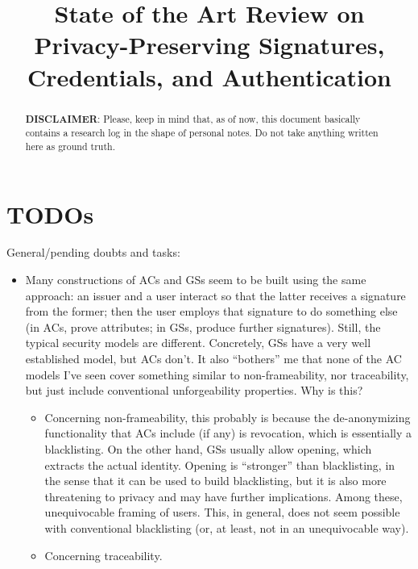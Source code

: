 \documentclass{llncs}%
\title{State of the Art Review on Privacy-Preserving Signatures, Credentials, and Authentication}
\author{}
\begin{document}
\maketitle


\begin{abstract}
	\textbf{DISCLAIMER}: Please, keep in mind that, as of now, this document
	basically contains a research log in the shape of personal notes. Do not take 
	anything written here as ground truth.
\end{abstract}










\section{TODOs}

General/pending doubts and tasks:

\begin{itemize}
\item Many constructions of ACs and GSs seem to be built using the same
  approach: an issuer and a user interact so that the latter receives a signature
  from the former; then the user employs that signature to do something else (in
  ACs, prove attributes; in GSs, produce further signatures). Still, the typical
  security models are different. Concretely, GSs have a very well established
  model, but ACs don't. It also ``bothers'' me that none of the AC models I've
  seen cover something similar to non-frameability, nor traceability, but just
  include conventional unforgeability properties. Why is this?
  \begin{itemize}
  \item Concerning non-frameability, this probably is because the de-anonymizing
    functionality that ACs include (if any) is revocation, which is essentially
    a blacklisting. On the other hand, GSs usually allow opening, which extracts
    the actual identity. Opening is ``stronger'' than blacklisting, in the sense
    that it can be used to build blacklisting, but it is also more threatening
    to privacy and may have further implications. Among these, unequivocable
    framing of users. This, in general, does not seem possible with conventional
    blacklisting (or, at least, not in an unequivocable way).
  \item Concerning traceability.
  \end{itemize}
\end{itemize}



\end{document}
